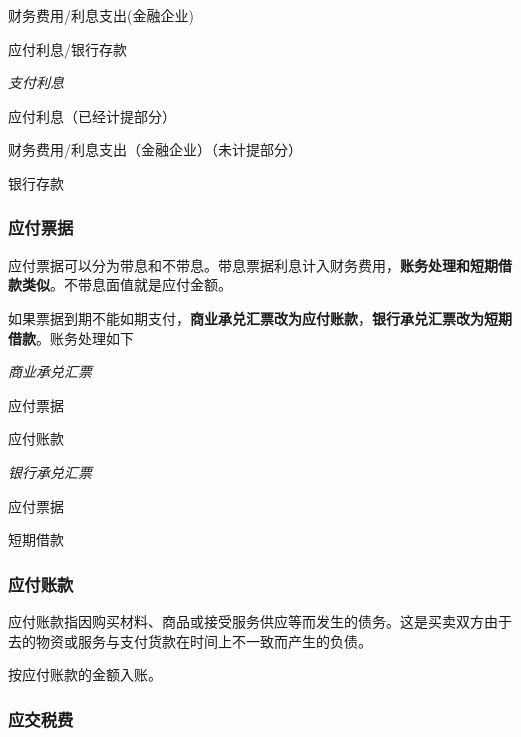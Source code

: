 \documentclass[UTF8,12pt]{ctexart}
\newenvironment{Dr}{%
	\begin{list}{}%
		{
			\setlength{\leftmargin}{2em}
			\setlength{\labelwidth}{2em}
			\setlength{\labelsep}{0pt}
			\setlength{\itemindent}{0pt}
			\setlength{\listparindent}{0pt}
			\setlength{\parsep}{0pt}
			\setlength{\topsep}{0pt}
		}
		\item[\textbf{借：}]
	}{%
	\end{list}
}
\newenvironment{Cr}{%
	\begin{list}{}%
		{
			\setlength{\leftmargin}{3em}
			\setlength{\labelwidth}{2em}
			\setlength{\labelsep}{0pt}
			\setlength{\itemindent}{0pt}
			\setlength{\listparindent}{0pt}
			\setlength{\parsep}{0pt}
			\setlength{\topsep}{0pt}
		}
		\item[\textbf{贷：}]
	}{%
	\end{list}
}
\numberwithin{equation}{section} %
\numberwithin{figure}{section}
\numberwithin{table}{section}
\begin{document}
	\begin{Dr}
		财务费用/利息支出(金融企业)
	\end{Dr}
	\begin{Cr}
		应付利息/银行存款
	\end{Cr}

	
	\textit{支付利息}
	
	\begin{Dr}
		应付利息（已经计提部分）
		
		财务费用/利息支出（金融企业）（未计提部分）
	\end{Dr}
	\begin{Cr}
		银行存款
	\end{Cr}
	

	
	\subsubsection{应付票据}
	应付票据可以分为带息和不带息。带息票据利息计入财务费用，\textbf{账务处理和短期借款类似}。不带息面值就是应付金额。
	
	如果票据到期不能如期支付，\textbf{商业承兑汇票改为应付账款}，\textbf{银行承兑汇票改为短期借款}。账务处理如下
	
	\textit{商业承兑汇票}
	
	\begin{Dr}
		应付票据
	\end{Dr}
	\begin{Cr}
		应付账款
	\end{Cr}

	
	\textit{银行承兑汇票}
	
	\begin{Dr}
		应付票据
	\end{Dr}
	\begin{Cr}
		短期借款
	\end{Cr}

	
	\subsubsection{应付账款}
	
	应付账款指因购买材料、商品或接受服务供应等而发生的债务。这是买卖双方由于去的物资或服务与支付货款在时间上不一致而产生的负债。
	
	按应付账款的金额入账。
	
	\subsubsection{应交税费}
	
\end{document}
